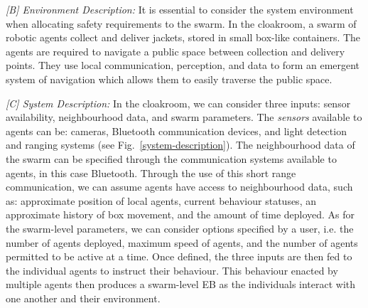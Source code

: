 \documentclass[runningheads]{llncs}
\begin{document}
\emph{[B] Environment Description:}
It is essential to consider the system environment when allocating safety requirements to the swarm. 
In the cloakroom, a swarm of robotic agents collect and deliver jackets, stored in small box-like containers. 
The agents are required to navigate a public space between collection and delivery points. They use local communication, perception, and data to form an emergent system of navigation which allows them to easily traverse the public space. 

\emph{[C] System Description:}
In the cloakroom, we can consider three inputs: sensor availability, neighbourhood data, and swarm parameters. 
The \emph{sensors} available to agents can be: cameras, Bluetooth communication devices, and light detection and ranging systems (see Fig.~\ref{system-description}). 
The neighbourhood data of the swarm can be specified through the communication systems available to agents, in this case Bluetooth. 
Through the use of this short range communication, we can assume agents have access to neighbourhood data, such as: approximate position of local agents, current behaviour statuses, an approximate history of box movement, and the amount of time deployed. 
As for the swarm-level parameters, we can consider options specified by a user, i.e. the number of agents deployed, maximum speed of agents, and the number of agents permitted to be active at a time.
Once defined, the three inputs are then fed to the individual agents to instruct their behaviour. This behaviour enacted by multiple agents then produces a swarm-level EB as the individuals interact with one another and their environment.
\end{document}
